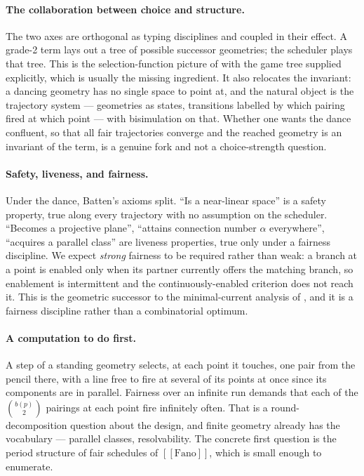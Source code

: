 \documentclass[11pt]{article}
\theoremstyle{plain}
\theoremstyle{definition}
\theoremstyle{remark}
\newcommand{\enc}[1]{[\![#1]\!]}
\begin{document}
\paragraph{The collaboration between choice and structure.} The two axes are orthogonal as
typing disciplines and coupled in their effect. A grade-2 term lays out a tree of possible
successor geometries; the scheduler plays that tree. This is the selection-function
picture of \cite{Choice} with the game tree supplied explicitly, which is usually the
missing ingredient. It also relocates the invariant: a dancing geometry has no single
space to point at, and the natural object is the trajectory system --- geometries as
states, transitions labelled by which pairing fired at which point --- with bisimulation
on that. Whether one wants the dance confluent, so that all fair trajectories converge and
the reached geometry is an invariant of the term, is a genuine fork and not a
choice-strength question.

\paragraph{Safety, liveness, and fairness.} Under the dance, Batten's axioms split. ``Is a
near-linear space'' is a safety property, true along every trajectory with no assumption
on the scheduler. ``Becomes a projective plane'', ``attains connection number $\alpha$
everywhere'', ``acquires a parallel class'' are liveness properties, true only under a
fairness discipline. We expect \emph{strong} fairness to be required rather than weak: a
branch at a point is enabled only when its partner currently offers the matching branch,
so enablement is intermittent and the continuously-enabled criterion does not reach it.
This is the geometric successor to the minimal-current analysis of \cite[\S5]{KnotsNote},
and it is a fairness discipline rather than a combinatorial optimum.

\paragraph{A computation to do first.} A step of a standing geometry selects, at each point
it touches, one pair from the pencil there, with a line free to fire at several of its
points at once since its components are in parallel. Fairness over an infinite run demands
that each of the $\binom{b(p)}{2}$ pairings at each point fire infinitely often. That is a
round-decomposition question about the design, and finite geometry already has the
vocabulary --- parallel classes, resolvability. The concrete first question is the period
structure of fair schedules of $\enc{\mathrm{Fano}}$, which is small enough to enumerate.
\end{document}
